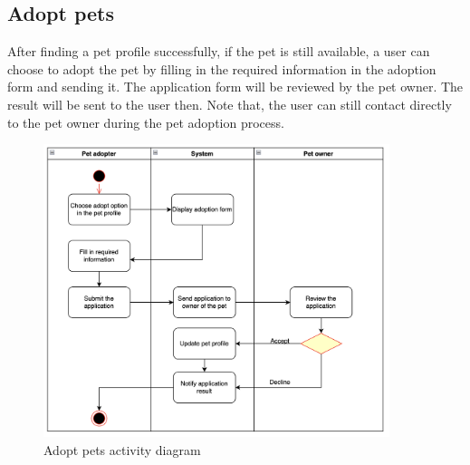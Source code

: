 \subsection{Adopt pets}
After finding a pet profile successfully, if the pet is still available, a user can choose to adopt the pet by filling in the required information in the adoption form and sending it. The application form will be reviewed by the pet owner. The result will be sent to the user then. Note that, the user can still contact directly to the pet owner during the pet adoption process.
\begin{figure}[H]
  \centering
  \includegraphics[width=0.9\textwidth]{Figures/adopt_pet.png}
  \caption{Adopt pets activity diagram}
  \label{fig:adopt-pet}
\end{figure}
\newpage

